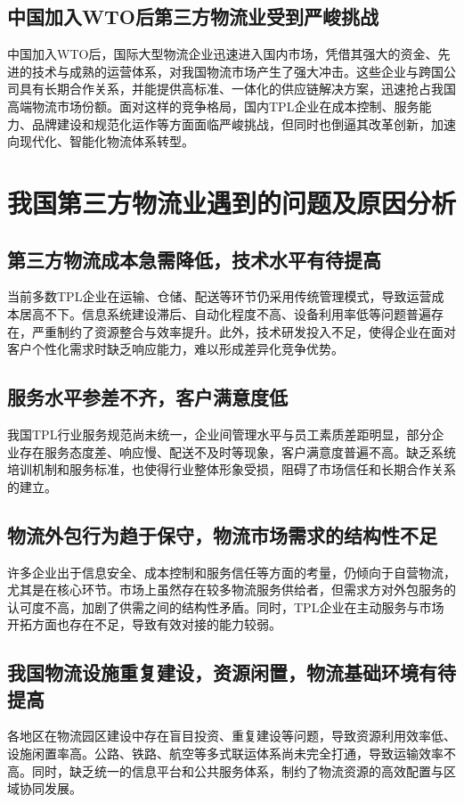 \documentclass[UTF-8]{CUFEpaper}
\begin{document}
\subsection{中国加入WTO后第三方物流业受到严峻挑战}
中国加入WTO后，国际大型物流企业迅速进入国内市场，凭借其强大的资金、先进的技术与成熟的运营体系，对我国物流市场产生了强大冲击。这些企业与跨国公司具有长期合作关系，并能提供高标准、一体化的供应链解决方案，迅速抢占我国高端物流市场份额。面对这样的竞争格局，国内TPL企业在成本控制、服务能力、品牌建设和规范化运作等方面面临严峻挑战，但同时也倒逼其改革创新，加速向现代化、智能化物流体系转型。

\section{我国第三方物流业遇到的问题及原因分析}
\subsection{第三方物流成本急需降低，技术水平有待提高}
当前多数TPL企业在运输、仓储、配送等环节仍采用传统管理模式，导致运营成本居高不下。信息系统建设滞后、自动化程度不高、设备利用率低等问题普遍存在，严重制约了资源整合与效率提升。此外，技术研发投入不足，使得企业在面对客户个性化需求时缺乏响应能力，难以形成差异化竞争优势。

\subsection{服务水平参差不齐，客户满意度低}
我国TPL行业服务规范尚未统一，企业间管理水平与员工素质差距明显，部分企业存在服务态度差、响应慢、配送不及时等现象，客户满意度普遍不高。缺乏系统培训机制和服务标准，也使得行业整体形象受损，阻碍了市场信任和长期合作关系的建立。

\subsection{物流外包行为趋于保守，物流市场需求的结构性不足}
许多企业出于信息安全、成本控制和服务信任等方面的考量，仍倾向于自营物流，尤其是在核心环节。市场上虽然存在较多物流服务供给者，但需求方对外包服务的认可度不高，加剧了供需之间的结构性矛盾。同时，TPL企业在主动服务与市场开拓方面也存在不足，导致有效对接的能力较弱。

\subsection{我国物流设施重复建设，资源闲置，物流基础环境有待提高}
各地区在物流园区建设中存在盲目投资、重复建设等问题，导致资源利用效率低、设施闲置率高。公路、铁路、航空等多式联运体系尚未完全打通，导致运输效率不高。同时，缺乏统一的信息平台和公共服务体系，制约了物流资源的高效配置与区域协同发展。
\end{document}
